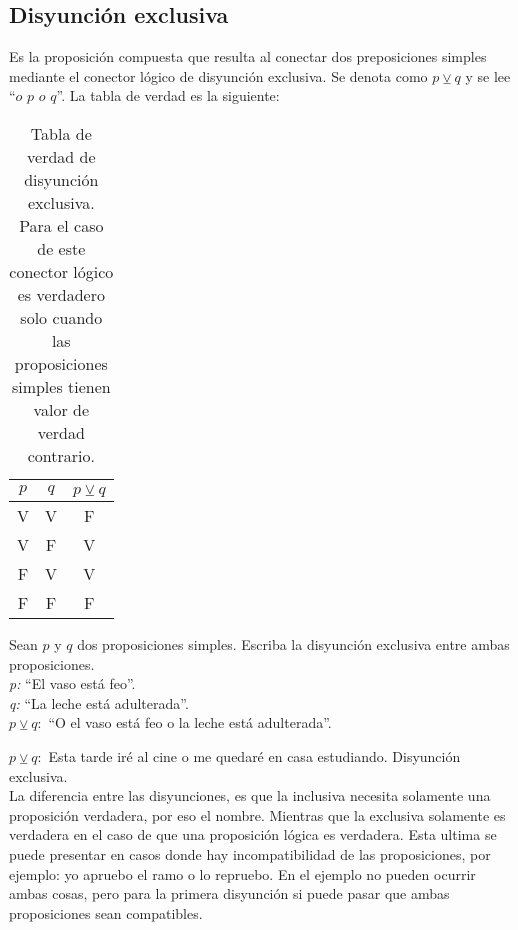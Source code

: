 \subsection{Disyunción exclusiva}
Es la proposición compuesta que resulta al conectar dos preposiciones simples mediante el conector lógico de disyunción exclusiva. Se denota como $p\veebar q$ y se lee ``$o$ $p$ $o$ $q$''. La tabla de verdad es la siguiente:\\
\begin{table}[h!]
	\begin{center}
		\begin{tabular}{|c|c|c|}
\hline
$p$&$q$&$p\veebar q$\\
\hline
V&V&F\\
\hline
V&F&V\\
\hline
F&V&V\\
\hline
F&F&F\\
\hline
		\end{tabular}
\caption[Tabla de verdad del operador lógico disyunción exclusiva.]{Tabla de verdad de disyunción exclusiva. Para el caso de este conector lógico es verdadero solo cuando las proposiciones simples tienen valor de verdad contrario.}
	\end{center}
\end{table}
\newpage
\begin{myexample}
Sean $p$ y $q$ dos proposiciones simples. Escriba la disyunción exclusiva entre ambas proposiciones.\\

\noindent\textit{p:} ``El vaso está feo''.\\
\textit{q:} ``La leche está adulterada''.\\
\textit{$p\veebar q:$} ``O el vaso está feo o la leche está adulterada''.\\
\end{myexample}



\noindent $p\veebar q:$ Esta tarde iré al cine o me quedaré en casa estudiando. Disyunción exclusiva.\\

La diferencia entre las disyunciones, es que la inclusiva necesita solamente una proposición verdadera, por eso el nombre. Mientras que la exclusiva solamente es verdadera en el caso de que una proposición lógica es verdadera. Esta ultima se puede presentar en casos donde hay incompatibilidad de las proposiciones, por ejemplo: yo apruebo el ramo o lo repruebo. En el ejemplo no pueden ocurrir ambas cosas, pero para la primera disyunción si puede pasar que ambas proposiciones sean compatibles.
